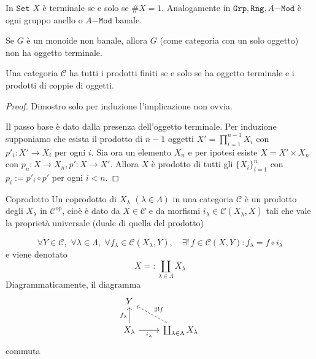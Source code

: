 \begin{example}{}
    In \(\mathtt{Set}\) \(X\) è terminale se e solo se \(\# X = 1\).
    Analogamente in \(\mathtt{Grp}, \mathtt{Rng}, A\mathtt{-Mod}\) è ogni gruppo
    anello o \(A\mathtt{-Mod}\) banale.
\end{example}

\begin{example}{}
    Se \(G\) è un monoide non banale, allora \(G\) (come categoria con un solo
    oggetto) non ha oggetto terminale.
\end{example}

\begin{proposition}{}
    Una categoria \(\mathcal{\mathcal{C}}\) ha tutti i prodotti finiti se e solo se ha
    oggetto terminale e i prodotti di coppie di oggetti.
\end{proposition}
\begin{proof}{}
    Dimostro solo per induzione l'implicazione non ovvia.

    Il passo base è dato dalla presenza dell'oggetto terminale.
    Per induzione supponiamo che esista
    il prodotto di \(n-1\) oggetti \(X'=\prod_{i = 1}^{n-1} X_i\) con \(p'_i :
    X' \to X_{i}\) per ogni \(i\). Sia ora un elemento \(X_n\) e per ipotesi
    esiste \(X = X' \times X_{n}\) con \(p_{n} : X \to X_{n}, p' : X \to X'\).
    Allora \(X\) è prodotto di tutti gli \(\{X_i\}_{i=1}^{n}\) con \(p_{i} :=
    p'_i \circ p'\) per ogni \(i < n\). 
\end{proof}

\begin{definition}{Coprodotto}
    Un coprodotto di \(X_\lambda\) \((\lambda \in \Lambda)\) in una categoria \(\mathcal{\mathcal{C}}\) è un prodotto degli \(X_\lambda\) in \(\mathcal{\mathcal{C}}^{op}\), cioè è dato da \(
    X \in \mathcal{\mathcal{C}}\) e da morfismi \(i_\lambda \in \mathcal{\mathcal{C}}{(X_\lambda, X)}\) tali che vale la proprietà universale (duale di quella del prodotto)

\[
  \forall Y \in \mathcal{C}, \,\, \forall \lambda \in \Lambda,\,\, \forall f_\lambda \in \mathcal{\mathcal{C}}{(X_\lambda, Y)}, \quad \exists ! \,f \in \mathcal{\mathcal{C}}{(X, Y)} : f_\lambda = f \circ i_\lambda
\]
e viene denotato 
\[
  X =: \coprod_{\lambda \in \Lambda} X_\lambda
\]
Diagrammaticamente, il diagramma
\[\begin{tikzcd}
	Y \\
	{X_\lambda} & \coprod_{\lambda \in \Lambda} X_\lambda
	\arrow["{f_\lambda}", from=2-1, to=1-1]
	\arrow["{i_\lambda}"', from=2-1, to=2-2]
	\arrow["{\exists! f}"', dashed, from=2-2, to=1-1]
\end{tikzcd}\]
commuta
\end{definition}

